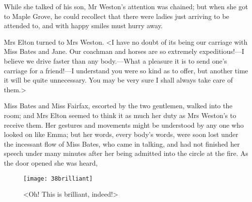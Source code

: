 While she talked of his son, Mr Weston's attention was chained; but when she got to Maple Grove, he could recollect that there were ladies just arriving to be attended to, and with happy smiles must hurry away.

Mrs Elton turned to Mrs Weston. <I have no doubt of its being our carriage with Miss Bates and Jane. Our coachman and horses are so extremely expeditious!—I believe we drive faster than any body.—What a pleasure it is to send one's carriage for a friend!—I understand you were so kind as to offer, but another time it will be quite unnecessary. You may be very sure I shall always take care of them.>

Miss Bates and Miss Fairfax, escorted by the two gentlemen, walked into the room; and Mrs Elton seemed to think it as much her duty as Mrs Weston's to receive them. Her gestures and movements might be understood by any one who looked on like Emma; but her words, every body's words, were soon lost under the incessant flow of Miss Bates, who came in talking, and had not finished her speech under many minutes after her being admitted into the circle at the fire. As the door opened she was heard,

\begin{figure}[tbph]
\centering
\texttt{[image: 38brilliant]}
\caption{<Oh! This is brilliant, indeed!>}
\end{figure}

